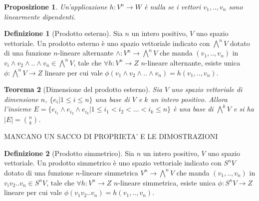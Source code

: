 \documentclass[11pt]{article}
\theoremstyle{plain}
\newtheorem{thm}{Teorema}[section]
\newtheorem{prop}[thm]{Proposizione}
\theoremstyle{definition}
\newtheorem{defn}{Definizione}[section]
\theoremstyle{remark}
\begin{document}
 \begin{prop}
  Un'applicazione $h: V^n \to W$ è nulla se i vettori $v_1,..,v_n$ sono linearmente dipendenti.
 \end{prop}

\begin{defn}[Prodotto esterno]
Sia $n$ un intero positivo, $V$ uno spazio vettoriale. Un prodotto esterno è uno spazio vettoriale indicato con $\bigwedge^n V$
dotato di una funzione $n$-lineare alternante $\wedge: V^n \to \bigwedge^n V$ che manda $(v_1,..,v_n)$ in 
$v_i\wedge v_2\wedge..\wedge v_n \in \bigwedge^n V$, tale che $\forall h: V^n \to Z$ $n$-lineare alternante, 
esiste unica $\phi: \bigwedge^n V \to Z $ lineare per cui vale $\phi(v_1\wedge v_2\wedge .. \wedge v_n)=h(v_1,..,v_n)$.

\label{defn:prodotto esterno}
\end{defn}





\begin{thm}[Dimensione del prodotto esterno]
Sia $V$ uno spazio vettoriale di dimensione $n$, $\{e_i| 1 \leq i \leq n\}$ una base di $V$ e $k$ un intero positivo.
Allora l'insieme $E=\{e_{i_1} \wedge e_{i_2} \wedge e_{i_k}| 1 \leq i_1 < i_2 <...< i_k \leq n\}$ è una base di $\bigwedge^k V$ 
e si ha $|E|= \binom {n}{k}$.

\label{thm:prodotto esterno}
\end{thm}


MANCANO UN SACCO DI PROPRIETA' E LE DIMOSTRAZIONI





\begin{defn}[Prodotto simmetrico]

Sia $n$ un intero positivo, $V$ uno spazio vettoriale. Un prodotto simmetrico è uno spazio vettoriale indicato con $S^n V$
dotato di una funzione $n$-lineare simmetrica $V^n \to \bigwedge^n V$ che manda $(v_1,..,v_n)$ in 
$v_i v_2..v_n \in S^n V$, tale che $\forall h: V^n \to Z$ $n$-lineare simmetrica, 
esiste unica $\phi: S^n V \to Z $ lineare per cui vale $\phi(v_1 v_2 .. v_n)=h(v_1,..,v_n)$.

\label{defn:prodotto simmetrico}
\end{defn}
\end{document}
